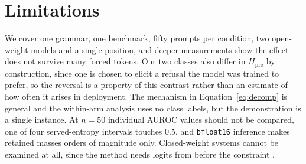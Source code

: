 \documentclass[11pt]{article}
\begin{document}
\section*{Limitations}

We cover one grammar, one benchmark, fifty prompts per condition, two open-weight
models and a single position, and deeper measurements show the effect does not
survive many forced tokens. Our two classes also differ in $H_{\text{pre}}$ by
construction, since one is chosen to elicit a refusal the model was trained to
prefer, so the reversal is a property of this contrast rather than an estimate of
how often it arises in deployment. The mechanism in Equation~\ref{eq:decomp} is
general and the within-arm analysis uses no class labels, but the demonstration
is a single instance. At $n\!=\!50$ individual AUROC values should not be
compared, one of four served-entropy intervals touches $0.5$, and
\texttt{bfloat16} inference makes retained masses orders of magnitude only.
Closed-weight systems cannot be examined at all, since the method needs logits
from before the constraint \citep{steindl-etal-2024-linguistic}.


\end{document}
